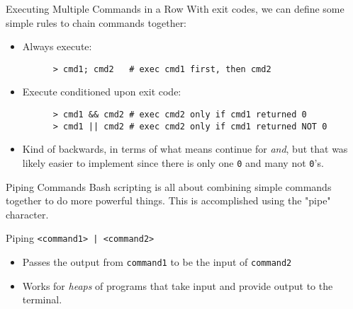 \documentclass[11pt]{beamer}
\newcommand{\colbf}[1]{\textcolor{mLightBrown!77!black}{#1}}%
\begin{document}
\begin{frame}[fragile]{Executing Multiple Commands in a Row}
  With exit codes, we can define some simple rules to chain commands together:

  \begin{itemize}[<+- | alert@+>]
    \item Always execute:

    \begin{verbatim}
      > cmd1; cmd2   # exec cmd1 first, then cmd2
    \end{verbatim}

    \item Execute conditioned upon exit code:

    \begin{verbatim}
      > cmd1 && cmd2 # exec cmd2 only if cmd1 returned 0
      > cmd1 || cmd2 # exec cmd2 only if cmd1 returned NOT 0
    \end{verbatim}

    \item Kind of backwards, in terms of what means continue for \emph{and}, but that was likely easier to implement
          since there is only one \texttt{0} and many \colbf{not} \texttt{0}'s.
  \end{itemize}
\end{frame}

\begin{frame}[fragile]{Piping Commands}
  Bash scripting is all about combining simple commands together to do more powerful things.  This is accomplished
  using the "pipe" character.

  \begin{block}{Piping}
    \texttt{<command1> | <command2>}
    \begin{itemize}
      \item Passes the output from \texttt{command1} to be the input of \texttt{command2}
      \item Works for \emph{heaps} of programs that take input and provide output to the terminal.
    \end{itemize}
  \end{block}
\end{frame}
\end{document}
